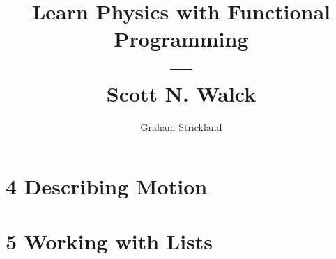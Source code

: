 \documentclass{article}
\title{Learn Physics with Functional Programming\\---\\Scott N. Walck}
\author{Graham Strickland}
\begin{document}
\maketitle  

\section*{4 Describing Motion}


\section*{5 Working with Lists}

\end{document}
